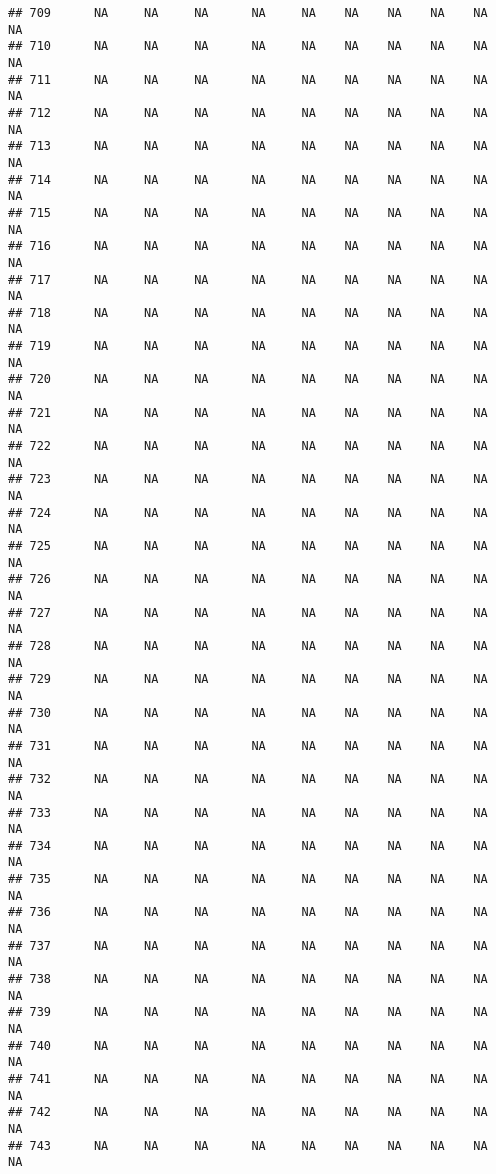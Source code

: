 \documentclass{article}\usepackage{graphicx, color}
\makeatletter
\newenvironment{kframe}{%
 \def\at@end@of@kframe{}%
 \ifinner\ifhmode%
  \def\at@end@of@kframe{\end{minipage}}%
  \begin{minipage}{\columnwidth}%
 \fi\fi%
 \def\FrameCommand##1{\hskip\@totalleftmargin \hskip-\fboxsep
 \colorbox{shadecolor}{##1}\hskip-\fboxsep
     \hskip-\linewidth \hskip-\@totalleftmargin \hskip\columnwidth}%
 \MakeFramed {\advance\hsize-\width
   \@totalleftmargin\z@ \linewidth\hsize
   \@setminipage}}%
 {\par\unskip\endMakeFramed%
 \at@end@of@kframe}
\newenvironment{knitrout}{}{} %
\makeatother
\begin{document}
\begin{knitrout}
\begin{kframe}
\begin{verbatim}
## 709      NA     NA     NA      NA     NA    NA    NA    NA    NA     NA
## 710      NA     NA     NA      NA     NA    NA    NA    NA    NA     NA
## 711      NA     NA     NA      NA     NA    NA    NA    NA    NA     NA
## 712      NA     NA     NA      NA     NA    NA    NA    NA    NA     NA
## 713      NA     NA     NA      NA     NA    NA    NA    NA    NA     NA
## 714      NA     NA     NA      NA     NA    NA    NA    NA    NA     NA
## 715      NA     NA     NA      NA     NA    NA    NA    NA    NA     NA
## 716      NA     NA     NA      NA     NA    NA    NA    NA    NA     NA
## 717      NA     NA     NA      NA     NA    NA    NA    NA    NA     NA
## 718      NA     NA     NA      NA     NA    NA    NA    NA    NA     NA
## 719      NA     NA     NA      NA     NA    NA    NA    NA    NA     NA
## 720      NA     NA     NA      NA     NA    NA    NA    NA    NA     NA
## 721      NA     NA     NA      NA     NA    NA    NA    NA    NA     NA
## 722      NA     NA     NA      NA     NA    NA    NA    NA    NA     NA
## 723      NA     NA     NA      NA     NA    NA    NA    NA    NA     NA
## 724      NA     NA     NA      NA     NA    NA    NA    NA    NA     NA
## 725      NA     NA     NA      NA     NA    NA    NA    NA    NA     NA
## 726      NA     NA     NA      NA     NA    NA    NA    NA    NA     NA
## 727      NA     NA     NA      NA     NA    NA    NA    NA    NA     NA
## 728      NA     NA     NA      NA     NA    NA    NA    NA    NA     NA
## 729      NA     NA     NA      NA     NA    NA    NA    NA    NA     NA
## 730      NA     NA     NA      NA     NA    NA    NA    NA    NA     NA
## 731      NA     NA     NA      NA     NA    NA    NA    NA    NA     NA
## 732      NA     NA     NA      NA     NA    NA    NA    NA    NA     NA
## 733      NA     NA     NA      NA     NA    NA    NA    NA    NA     NA
## 734      NA     NA     NA      NA     NA    NA    NA    NA    NA     NA
## 735      NA     NA     NA      NA     NA    NA    NA    NA    NA     NA
## 736      NA     NA     NA      NA     NA    NA    NA    NA    NA     NA
## 737      NA     NA     NA      NA     NA    NA    NA    NA    NA     NA
## 738      NA     NA     NA      NA     NA    NA    NA    NA    NA     NA
## 739      NA     NA     NA      NA     NA    NA    NA    NA    NA     NA
## 740      NA     NA     NA      NA     NA    NA    NA    NA    NA     NA
## 741      NA     NA     NA      NA     NA    NA    NA    NA    NA     NA
## 742      NA     NA     NA      NA     NA    NA    NA    NA    NA     NA
## 743      NA     NA     NA      NA     NA    NA    NA    NA    NA     NA

\end{verbatim}
\end{kframe}
\end{knitrout}
\end{document}
